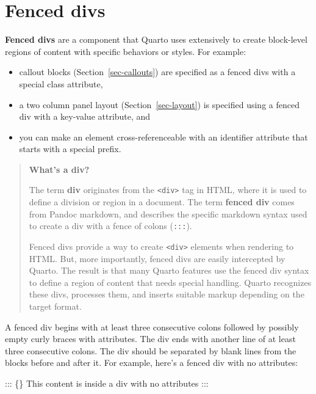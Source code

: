 \documentclass[
  letterpaper,
  DIV=11,
  numbers=noendperiod,
  oneside]{scrreprt}
\newenvironment{Shaded}{\begin{snugshade}}{\end{snugshade}}
\newcommand{\NormalTok}[1]{\textcolor[rgb]{0.00,0.23,0.31}{#1}}
\providecommand{\tightlist}{%
  \setlength{\itemsep}{0pt}\setlength{\parskip}{0pt}}
\begin{document}
\begin{tcolorbox}
\begin{figure}[H]
\end{figure}%

\section{Fenced divs}\label{sec-fenced-divs}

\textbf{Fenced divs} are a component that Quarto uses extensively to
create block-level regions of content with specific behaviors or styles.
For example:

\begin{itemize}
\tightlist
\item
  callout blocks (Section~\ref{sec-callouts}) are specified as a fenced
  divs with a special class attribute,
\item
  a two column panel layout (Section~\ref{sec-layout}) is specified
  using a fenced div with a key-value attribute, and
\item
  you can make an element cross-referenceable with an identifier
  attribute that starts with a special prefix.
\end{itemize}

\begin{quote}
\textbf{What's a div?}

The term \textbf{div} originates from the
\texttt{\textless{}div\textgreater{}} tag in HTML, where it is used to
define a division or region in a document. The term \textbf{fenced div}
comes from Pandoc markdown, and describes the specific markdown syntax
used to create a div with a fence of colons (\texttt{:::}).

Fenced divs provide a way to create
\texttt{\textless{}div\textgreater{}} elements when rendering to HTML.
But, more importantly, fenced divs are easily intercepted by Quarto. The
result is that many Quarto features use the fenced div syntax to define
a region of content that needs special handling. Quarto recognizes these
divs, processes them, and inserts suitable markup depending on the
target format.
\end{quote}

A fenced div begins with at least three consecutive colons followed by
possibly empty curly braces with attributes. The div ends with another
line of at least three consecutive colons. The div should be separated
by blank lines from the blocks before and after it. For example, here's
a fenced div with no attributes:

\begin{Shaded}
\begin{Highlighting}[]
\NormalTok{::: \{\}}
\NormalTok{This content is inside a div with no attributes}
\NormalTok{:::}
\end{Highlighting}
\end{Shaded}


\end{tcolorbox}
\end{document}
